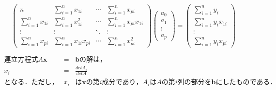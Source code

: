 \documentclass[dvipdfmx]{jsarticle}
\begin{document}
\begin{equation}
  \left(
  \begin{array}{cccc}
    \displaystyle
    n                         &
    \displaystyle
    \sum_{i=1}^n x_{1i}       &
    \displaystyle
    \cdots                    &
    \displaystyle
    \sum_{i=1}^n x_{pi}         \\
    \displaystyle
    \sum_{i=1}^n x_{1i}       &
    \displaystyle
    \sum_{i=1}^n x_{1i}^2     &
    \displaystyle
    \cdots                    &
    \displaystyle
    \sum_{i=1}^n x_{pi}x_{1i}   \\
    \vdots                    &
    \vdots                    &
    \ddots                    &
    \vdots                      \\
    \displaystyle
    \sum_{i=1}^n x_{pi}       &
    \displaystyle
    \sum_{i=1}^n x_{1i}x_{pi} &
    \displaystyle
    \cdots                    &
    \displaystyle
    \sum_{i=1}^n x_{pi}^2
  \end{array}
  \right)
  \left(
  \begin{array}{c}
    a_0    \\
    a_1    \\
    \vdots \\
    a_p
  \end{array}
  \right)
  =
  \left(
  \begin{array}{c}
    \displaystyle
    \sum_{i=1}^n y_i       \\
    \displaystyle
    \sum_{i=1}^n y_ix_{1i} \\
    \vdots                 \\
    \displaystyle
    \sum_{i=1}^n y_ix_{pi}
  \end{array}
  \right)
\end{equation}

\begin{eqnarray}
連立方程式A\boldsymbol{x}&=&\boldsymbol{b}の解は，\nonumber \\
x_i&=&\frac{detA_i}{detA} \nonumber \\
となる．ただし，&x_i&は\boldsymbol{x}の第i成分であり，A_iはAの第i列の部分を\boldsymbol{b}にしたものである．
\end{eqnarray}
\end{document}
